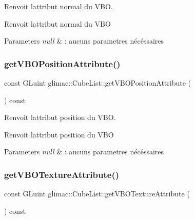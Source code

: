 Renvoit l\textquotesingle{}attribut normal du V\+BO. 

Renvoit l\textquotesingle{}attribut normal du V\+BO


\begin{DoxyParams}{Parameters}
{\em null} & \+: aucuns parametres nécéssaires \\
\hline
\end{DoxyParams}
\mbox{\label{classglimac_1_1CubeList_a1764c95ba262915ed56bf396f824d3bc}} 
\subsubsection{\texorpdfstring{get\+V\+B\+O\+Position\+Attribute()}{getVBOPositionAttribute()}}
{\footnotesize\ttfamily const G\+Luint glimac\+::\+Cube\+List\+::get\+V\+B\+O\+Position\+Attribute (\begin{DoxyParamCaption}{ }\end{DoxyParamCaption}) const\hspace{0.3cm}{\ttfamily [inline]}}



Renvoit l\textquotesingle{}attribut position du V\+BO. 

Renvoit l\textquotesingle{}attribut position du V\+BO


\begin{DoxyParams}{Parameters}
{\em null} & \+: aucuns parametres nécéssaires \\
\hline
\end{DoxyParams}
\mbox{\label{classglimac_1_1CubeList_a5f22e728a943a43cad45323054e5bca0}} 
\subsubsection{\texorpdfstring{get\+V\+B\+O\+Texture\+Attribute()}{getVBOTextureAttribute()}}
{\footnotesize\ttfamily const G\+Luint glimac\+::\+Cube\+List\+::get\+V\+B\+O\+Texture\+Attribute (\begin{DoxyParamCaption}{ }\end{DoxyParamCaption}) const\hspace{0.3cm}{\ttfamily [inline]}}



